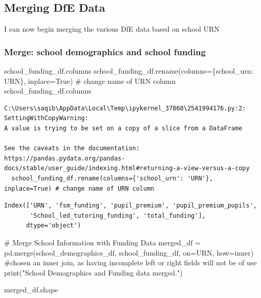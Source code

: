 \documentclass[
  letterpaper,
  DIV=11,
  numbers=noendperiod]{scrartcl}
\newenvironment{Shaded}{\begin{snugshade}}{\end{snugshade}}
\newcommand{\BuiltInTok}[1]{\textcolor[rgb]{0.00,0.23,0.31}{#1}}
\newcommand{\CommentTok}[1]{\textcolor[rgb]{0.37,0.37,0.37}{#1}}
\newcommand{\NormalTok}[1]{\textcolor[rgb]{0.00,0.23,0.31}{#1}}
\newcommand{\OperatorTok}[1]{\textcolor[rgb]{0.37,0.37,0.37}{#1}}
\newcommand{\StringTok}[1]{\textcolor[rgb]{0.13,0.47,0.30}{#1}}
\newcommand{\VariableTok}[1]{\textcolor[rgb]{0.07,0.07,0.07}{#1}}
\begin{document}
\subsection{Merging DfE Data}\label{merging-dfe-data}

I can now begin merging the various DfE data based on school URN

\subsubsection{Merge: school demographics and school
funding}\label{merge-school-demographics-and-school-funding}

\begin{Shaded}
\begin{Highlighting}[]
\NormalTok{school\_funding\_df.columns}
\NormalTok{school\_funding\_df.rename(columns}\OperatorTok{=}\NormalTok{\{}\StringTok{\textquotesingle{}school\_urn\textquotesingle{}}\NormalTok{: }\StringTok{\textquotesingle{}URN\textquotesingle{}}\NormalTok{\}, inplace}\OperatorTok{=}\VariableTok{True}\NormalTok{) }\CommentTok{\# change name of URN column}
\NormalTok{school\_funding\_df.columns}
\end{Highlighting}
\end{Shaded}

\begin{verbatim}
C:\Users\saqib\AppData\Local\Temp\ipykernel_37860\2541994176.py:2: SettingWithCopyWarning: 
A value is trying to be set on a copy of a slice from a DataFrame

See the caveats in the documentation: https://pandas.pydata.org/pandas-docs/stable/user_guide/indexing.html#returning-a-view-versus-a-copy
  school_funding_df.rename(columns={'school_urn': 'URN'}, inplace=True) # change name of URN column
\end{verbatim}

\begin{verbatim}
Index(['URN', 'fsm_funding', 'pupil_premium', 'pupil_premium_pupils',
       'School_led_tutoring_funding', 'total_funding'],
      dtype='object')
\end{verbatim}

\begin{Shaded}
\begin{Highlighting}[]

\CommentTok{\# Merge School Information with Funding Data}
\NormalTok{merged\_df }\OperatorTok{=}\NormalTok{ pd.merge(school\_demographics\_df, school\_funding\_df, on}\OperatorTok{=}\StringTok{\textquotesingle{}URN\textquotesingle{}}\NormalTok{, how}\OperatorTok{=}\StringTok{\textquotesingle{}inner\textquotesingle{}}\NormalTok{) }
\CommentTok{\#chosen an inner join, as having incomplete left or right fields will not be of use}
\BuiltInTok{print}\NormalTok{(}\StringTok{"School Demographics and Funding data merged."}\NormalTok{)}

\NormalTok{merged\_df.shape}
\end{Highlighting}
\end{Shaded}
\end{document}

